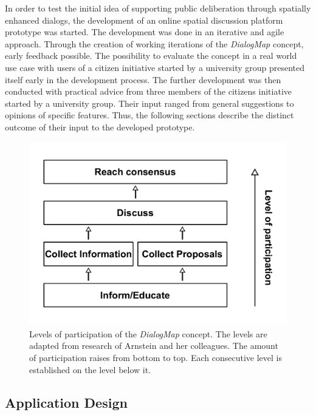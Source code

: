 In order to test the initial idea of supporting public deliberation through spatially enhanced dialogs, the development of an online spatial discussion platform prototype was started. The development was done in an iterative and agile approach. Through the creation of working iterations of the \textit{DialogMap} concept, early feedback possible. The possibility to evaluate the concept in a real world use case with users of a citizen initiative started by a university group presented itself early in the development process. The further development was then conducted with practical advice from three members of the citizens initiative started by a university group. Their input ranged from general suggestions to opinions of specific features. Thus, the following sections describe the distinct outcome of their input to the developed prototype.

\begin{figure}[!h]
    \centering
    \includegraphics[width=1\columnwidth]{images/my_ladder}
    \caption{Levels of participation of the \textit{DialogMap} concept. The levels are adapted from research of Arnstein and her colleagues. The amount of participation raises from bottom to top. Each consecutive level is established on the level below it.}
    \label{fig:my_ladder}
\end{figure}


\subsection{Application Design}
\label{sub:design}

